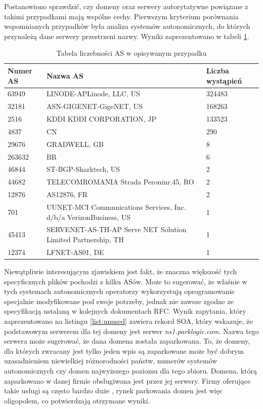 Postanowiono sprawdzić, czy domeny oraz serwery autorytatywne powiązane z takimi przypadkami mają
wspólne cechy. Pierwszym kryterium porównania wspomnianych przypadków była analiza systemów autonomicznych, do których przynależą
dane serwery przestrzeni nazwy. Wyniki zaprezentowano w tabeli \ref{tab:unused}.
\begin{table}[h]
	\centering
	\caption{Tabela liczebności AS w opisywanym przypadku}
	\label{tab:unused}
	\begin{tabular}{|p{}|p{}|p{}|}
		\hline
		\textbf{Numer AS} &
		\textbf{Nazwa AS} &
		\textbf{Liczba wystąpień} \\
		\hline\hline
		63949 & LINODE-APLinode, LLC, US & 324483 \\
		\hline
		32181 & ASN-GIGENET-GigeNET, US & 168263 \\
		\hline
		2516 & KDDI KDDI CORPORATION, JP & 133523 \\
		\hline
		4837 &  CN & 290 \\
		\hline
		29676 & GRADWELL, GB & 8 \\
		\hline
		263632 & BR & 6 \\
		\hline
		46844 & ST-BGP-Sharktech, US & 2 \\
		\hline
		44682 & TELECOMROMANIA Strada Peroninr.45, RO & 2 \\
		\hline
		12876 & AS12876, FR & 2 \\
		\hline
		701 & UUNET-MCI Communications Services, Inc. d/b/a VerizonBusiness, US & 1 \\
		\hline
		45413 & SERVENET-AS-TH-AP Serve NET Solution Limited Partnership, TH & 1 \\
		\hline
		12374 & LFNET-AS01, DE & 1 \\
		\hline
	\end{tabular}
\end{table}

Niewątpliwie interesującym zjawiskiem jest fakt, że znaczna większość tych specyficznych plików pochodzi z kilku ASów.
Może to sugerować, że właśnie w tych systemach autonomicznych operatorzy wykorzystują oprogramowanie specjalnie modyfikowane
pod swoje potrzeby, jednak nie zawsze zgodne ze specyfikacją ustalaną w kolejnych dokumentach RFC. Wynik zapytania, który zaprezentowano
na listingu \ref{list:unused} zawiera rekord SOA, który wskazuje, że podstawowym serwerem dla tej domeny jest
serwer \textit{ns1.parklogic.com}. Nazwa tego serwera może sugerować, że dana domena została zaparkowana. To, że domeny, dla których
zwracany jest tylko jeden wpis są zaparkowane może być dobrym uzasadnieniem niewielkiej różnorodności państw, numerów systemów
autonomicznych czy domen najwyższego poziomu dla tego zbioru. Domena, którą zaparkowano w danej firmie obsługiwana jest przez jej serwery.
Firmy oferujące takie usługi są często bardzo duże \cite{sedo}, rynek parkowania domen jest więc oligopolem, co potwierdzają otrzymane
wyniki.

